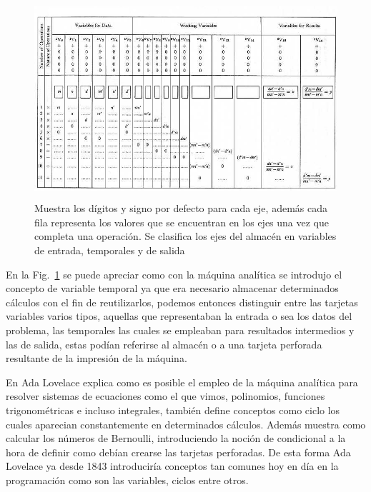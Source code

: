 \documentclass[runningheads,a4paper]{llncs}
\begin{document}
\begin{figure}
	\centering
	\includegraphics[height=7.4cm]{imgs/ltable}
	\caption{Muestra los dígitos y signo por defecto para cada eje, además cada fila representa los valores que se encuentran en los ejes una vez que completa una operación. Se clasifica los ejes del almacén en variables de entrada, temporales y de salida}
	\label{fig:ltable}
\end{figure}

En la Fig.~\ref{fig:ltable} se puede apreciar como con la máquina analítica se introdujo el concepto de variable temporal ya que era necesario almacenar determinados cálculos con el fin de reutilizarlos, podemos entonces distinguir entre las tarjetas variables varios tipos, aquellas que representaban la entrada o sea los datos del problema, las temporales las cuales se empleaban para resultados intermedios y las de salida, estas podían referirse al almacén o a una tarjeta perforada resultante de la impresión de la máquina. 

\newpage

En \cite{lovelace} Ada Lovelace explica como es posible el empleo de la máquina analítica para resolver sistemas de ecuaciones como el que vimos, polinomios, funciones trigonométricas e incluso integrales, también define conceptos como ciclo los cuales aparecian constantemente en determinados cálculos. Además muestra como calcular los números de Bernoulli, introduciendo la noción de condicional a la hora de definir como debían crearse las tarjetas perforadas.
De esta forma Ada Lovelace ya desde 1843 introduciría conceptos tan comunes hoy en día en la programación como son las variables, ciclos entre otros.
\end{document}
